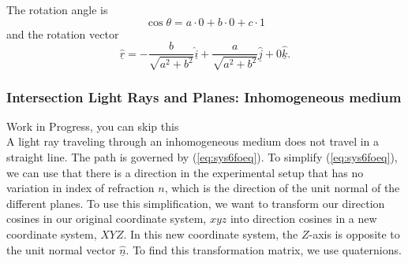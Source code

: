 \documentclass{article}
\begin{document}
The rotation angle is
\begin{equation}
	\cos \theta = a \cdot 0 + b \cdot 0 + c \cdot 1
\end{equation}
and the rotation vector
\begin{equation}
	\underline{\hat{r}} = - \frac{b}{\sqrt{a^2+b^2}} \underline{\hat{i}} + \frac{a}{\sqrt{a^2+b^2}}  \underline{\hat{j}} + 0  \underline{\hat{k}}.
\end{equation}

\subsubsection{Intersection Light Rays and Planes: Inhomogeneous medium}
{\color{red} Work in Progress, you can skip this} \\
A light ray traveling through an inhomogeneous medium does not travel in a straight line. The path is governed by (\ref{eq:sys6foeq}). To simplify (\ref{eq:sys6foeq}), we can use that there is a direction in the experimental setup that has no variation in index of refraction $n$, which is the direction of the unit normal of the different planes. To use this simplification, we want to transform our direction cosines in our original coordinate system, $xyz$ into direction cosines in a new coordinate system, $XYZ$. In this new coordinate system, the $Z$-axis is opposite to the unit normal vector $\underline{\hat{n}}$. To find this transformation matrix, we use quaternions.
\end{document}
